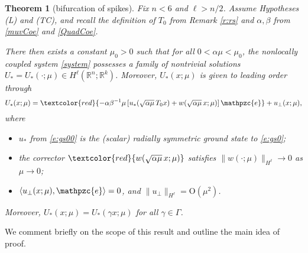 \documentclass[10pt]{article}
\newtheorem{Theorem}{Theorem}
\newcommand{\R}{\mathbb{R}}
\newcommand{\rmO}{\mathrm{O}}
\newcommand{\rmo}{\mathrm{o}}
\newcommand{\K}{\mathcal{K}}
\newcommand{\e}{\mathpzc{e}}
\begin{document}
\begin{Theorem}[bifurcation of spikes]\label{MainRes} Fix $n<6$ and $\ell>n/2$.  Assume Hypotheses (L) and (TC), and  recall the definition of $T_0$ from Remark \ref{r:rs} and $\alpha,\beta$ from \eqref{muvCoe} and \eqref{QuadCoe}.

There then exists a constant $\mu_0>0$ such that for all $0< \alpha\mu<\mu_0$, the nonlocally coupled system \eqref{system} possesses a  family of nontrivial solutions $U_*=U_*(\cdot;\mu) \in H^\ell(\R^n;\R^k)$. Moreover, $U_*(x;\mu)$ is given to leading order through
\begin{equation}\label{expan}
U_*(x;\mu) =  \textcolor{red}{-\alpha\beta^{-1}\mu\left[ u_*(\sqrt{\alpha\mu} \,T_0 x)+w(\sqrt{\alpha\mu} \, x;\mu)\right]{\e} }+ u_{\perp}(x;\mu),
\end{equation}
where 
\begin{itemize}
\item $u_*$ from \eqref{e:gs00} is the  (scalar) radially symmetric ground state to \eqref{e:gs0};
\item the corrector $\textcolor{red}{w(\sqrt{\alpha\mu} \, x;\mu)}$ satisfies  $\|w(\cdot;\mu)\|_{H^\ell} \to 0$ as $\mu \to 0$;
\item $\langle u_{\perp}(x;\mu),{\e}\rangle=0$, and $\|u_{\perp}\|_{H^\ell} = \rmO(\mu^2)$.
\end{itemize}
Moreover, $U_*(x;\mu)=U_*(\gamma x;\mu)$ for all $\gamma\in\Gamma$. 
% 
% 
% 
\end{Theorem}

We comment briefly on the scope of this result and outline the main idea of proof. 
\end{document}
